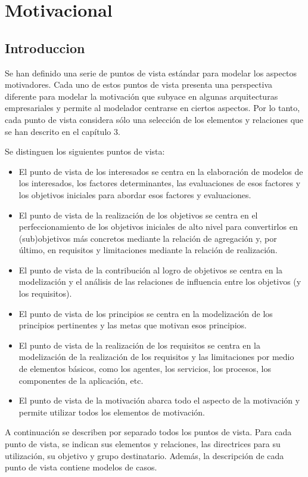 \chapter{Motivacional}
\section{Introduccion}
Se han definido una serie de puntos de vista estándar para modelar los aspectos motivadores. Cada uno de estos puntos de vista presenta una perspectiva diferente para modelar la motivación que subyace en algunas arquitecturas empresariales y permite al modelador centrarse en ciertos aspectos. Por lo tanto, cada punto de vista considera sólo una selección de los elementos y relaciones que se han descrito en el capítulo 3.

Se distinguen los siguientes puntos de vista:

\begin{itemize}
	\item El punto de vista de los interesados se centra en la elaboración de modelos de los interesados, los factores determinantes, las evaluaciones de esos factores y los objetivos iniciales para abordar esos factores y evaluaciones.
	\item El punto de vista de la realización de los objetivos se centra en el perfeccionamiento de los objetivos iniciales de alto nivel para convertirlos en (sub)objetivos más concretos mediante la relación de agregación y, por último, en requisitos y limitaciones mediante la relación de realización.
	\item El punto de vista de la contribución al logro de objetivos se centra en la modelización y el análisis de las relaciones de influencia entre los objetivos (y los requisitos).
	\item El punto de vista de los principios se centra en la modelización de los principios pertinentes y las metas que motivan esos principios.
	\item El punto de vista de la realización de los requisitos se centra en la modelización de la realización de los requisitos y las limitaciones por medio de elementos básicos, como los agentes, los servicios, los procesos, los componentes de la aplicación, etc.
	\item El punto de vista de la motivación abarca todo el aspecto de la motivación y permite utilizar todos los elementos de motivación.
\end{itemize}

A continuación se describen por separado todos los puntos de vista. Para cada punto de vista, se indican sus elementos y relaciones, las directrices para su utilización, su objetivo y grupo destinatario. Además, la descripción de cada punto de vista contiene modelos de casos.
\newpage

